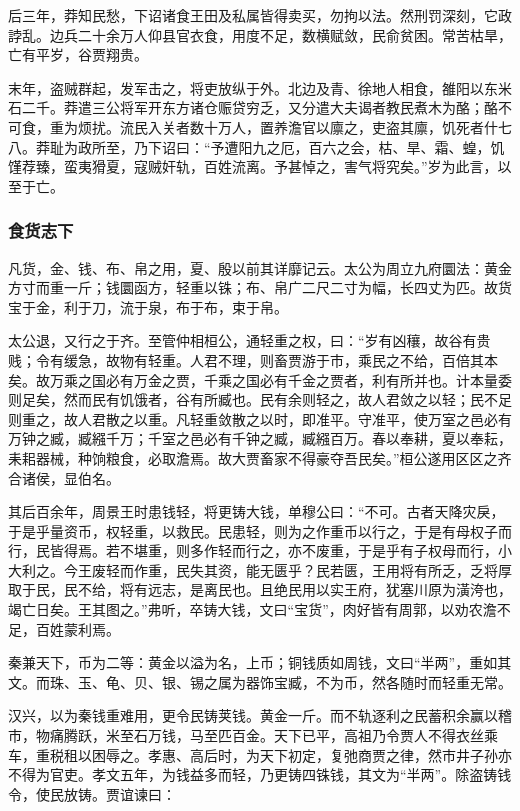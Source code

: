 \documentclass[]{article}
\begin{document}
后三年，莽知民愁，下诏诸食王田及私属皆得卖买，勿拘以法。然刑罚深刻，它政誖乱。边兵二十余万人仰县官衣食，用度不足，数横赋敛，民俞贫困。常苦枯旱，亡有平岁，谷贾翔贵。

末年，盗贼群起，发军击之，将吏放纵于外。北边及青、徐地人相食，雒阳以东米石二千。莽遣三公将军开东方诸仓赈贷穷乏，又分遣大夫谒者教民煮木为酪；酪不可食，重为烦扰。流民入关者数十万人，置养澹官以廪之，吏盗其廪，饥死者什七八。莽耻为政所至，乃下诏曰：``予遭阳九之厄，百六之会，枯、旱、霜、蝗，饥馑荐臻，蛮夷猾夏，寇贼奸轨，百姓流离。予甚悼之，害气将究矣。''岁为此言，以至于亡。

\hypertarget{header-n1623}{%
\subsubsection{食货志下}\label{header-n1623}}

凡货，金、钱、布、帛之用，夏、殷以前其详靡记云。太公为周立九府圜法：黄金方寸而重一斤；钱圜函方，轻重以铢；布、帛广二尺二寸为幅，长四丈为匹。故货宝于金，利于刀，流于泉，布于布，束于帛。

太公退，又行之于齐。至管仲相桓公，通轻重之权，曰：``岁有凶穰，故谷有贵贱；令有缓急，故物有轻重。人君不理，则畜贾游于市，乘民之不给，百倍其本矣。故万乘之国必有万金之贾，千乘之国必有千金之贾者，利有所并也。计本量委则足矣，然而民有饥饿者，谷有所臧也。民有余则轻之，故人君敛之以轻；民不足则重之，故人君散之以重。凡轻重敛散之以时，即准平。守准平，使万室之邑必有万钟之臧，臧繦千万；千室之邑必有千钟之臧，臧繦百万。春以奉耕，夏以奉耘，耒耜器械，种饷粮食，必取澹焉。故大贾畜家不得豪夺吾民矣。''桓公遂用区区之齐合诸侯，显伯名。

其后百余年，周景王时患钱轻，将更铸大钱，单穆公曰：``不可。古者天降灾戾，于是乎量资币，权轻重，以救民。民患轻，则为之作重币以行之，于是有母权子而行，民皆得焉。若不堪重，则多作轻而行之，亦不废重，于是乎有子权母而行，小大利之。今王废轻而作重，民失其资，能无匮乎？民若匮，王用将有所乏，乏将厚取于民，民不给，将有远志，是离民也。且绝民用以实王府，犹塞川原为潢洿也，竭亡日矣。王其图之。''弗听，卒铸大钱，文曰``宝货''，肉好皆有周郭，以劝农澹不足，百姓蒙利焉。

秦兼天下，币为二等：黄金以溢为名，上币；铜钱质如周钱，文曰``半两''，重如其文。而珠、玉、龟、贝、银、锡之属为器饰宝臧，不为币，然各随时而轻重无常。

汉兴，以为秦钱重难用，更令民铸荚钱。黄金一斤。而不轨逐利之民蓄积余赢以稽市，物痛腾跃，米至石万钱，马至匹百金。天下已平，高祖乃令贾人不得衣丝乘车，重税租以困辱之。孝惠、高后时，为天下初定，复弛商贾之律，然市井子孙亦不得为官吏。孝文五年，为钱益多而轻，乃更铸四铢钱，其文为``半两''。除盗铸钱令，使民放铸。贾谊谏曰：
\end{document}
